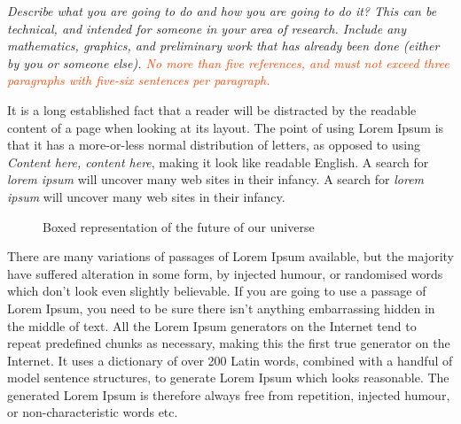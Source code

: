\documentclass[letterpaper,12pt,fleqn]{article}
\begin{document}
\textsl{Describe what you are going to do and how you are going to do it?
This can be technical, and intended for someone in your area of research.
Include any mathematics, graphics, and preliminary work that has already been 
done (either by you or someone else). \textcolor{OrangeRed}{No more than
five references, and must not exceed three paragraphs with five-six sentences 
per paragraph.}}

It is a long established fact \cite{GN2006, EPR1935} that a reader will be 
distracted by the readable content of a page when looking at its layout. The 
point of using Lorem Ipsum is that it has a more-or-less normal distribution 
of letters, as opposed to using \textsl{Content here, content here}, making it 
look like readable English. A search for \textsl{lorem ipsum} will uncover 
many web sites in their infancy. A search for \textsl{lorem ipsum} will uncover
many web sites in their infancy.

\begin{figure}[hbt]
  \begin{center}
    \caption{Boxed representation of the future of our universe}
    \label{FIG01}
  \end{center}
\end{figure}

\newpage
There are many variations of passages of Lorem Ipsum available, but the
majority have suffered alteration in some form, by injected humour, or
randomised words which don't look even slightly believable. If you are going to
use a passage of Lorem Ipsum, you need to be sure there isn't anything
embarrassing hidden in the middle of text. All the Lorem Ipsum generators on
the Internet tend to repeat predefined chunks as necessary, making this the
first true generator on the Internet. It uses a dictionary of over 200 Latin
words, combined with a handful of model sentence structures, to generate Lorem
Ipsum which looks reasonable. The generated Lorem Ipsum is therefore always
free from repetition, injected humour, or non-characteristic words etc.
\end{document}
